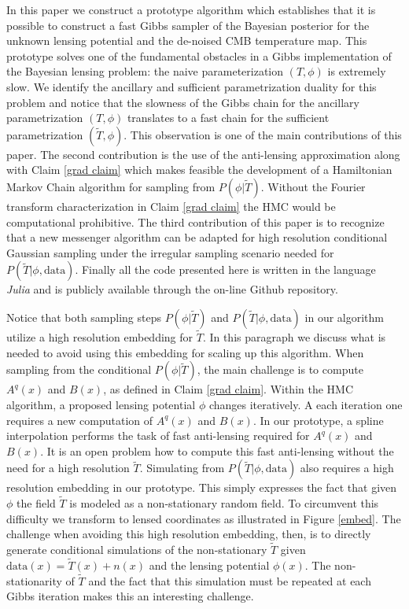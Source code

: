 \documentclass[iop,revtex4,apj,onecolumn]{emulateapj}
\begin{document}
In this paper we construct a prototype algorithm which establishes that it is possible to construct a fast Gibbs sampler of the Bayesian posterior for the unknown lensing potential and the de-noised CMB temperature map. This prototype solves one of the fundamental obstacles in a Gibbs implementation of the Bayesian lensing problem: the naive parameterization $(T, \phi)$ is extremely slow. We identify the ancillary and sufficient parametrization duality for this problem and notice that the slowness of the Gibbs chain for the ancillary parametrization  $(T, \phi)$ translates to a fast chain for the sufficient parametrization  $(\widetilde T, \phi)$. This observation is one of the main contributions of this paper. The second contribution is the use of the anti-lensing approximation along with Claim \ref{grad claim} which makes feasible the development of a Hamiltonian Markov Chain algorithm for sampling from  $P(\phi | \widetilde T)$. Without the Fourier transform characterization in Claim \ref{grad claim} the HMC would be computational prohibitive. The third contribution of this paper is to recognize that a new messenger algorithm \cite{elsner2013efficient,jasche2014matrix} can be adapted for high resolution conditional Gaussian sampling under the irregular sampling scenario needed for $P(\widetilde T|\phi, \text{data})$.  Finally all the code presented here is written in the language {\em Julia} \citep{bezanson2012julia}  and is publicly available through the on-line Github repository.  


Notice that both sampling steps $P(\phi |\widetilde T)$ and $P(\widetilde T|\phi, \text{data})$ in our algorithm utilize a high resolution embedding for $\widetilde T$. In this paragraph we discuss what is needed to avoid using this embedding for scaling up this algorithm. When sampling from the conditional $P(\phi |\widetilde T)$, the main challenge is to compute $A^q(x)$ and $B(x)$, as defined in Claim  \ref{grad claim}.  Within the HMC algorithm, a proposed lensing potential $\phi$ changes iteratively. A each iteration  one requires a new computation of $A^q(x)$ and $B(x)$. In our prototype, a spline interpolation performs the task of fast anti-lensing required for  $A^q(x)$ and $B(x)$. It is an open problem how to compute this fast anti-lensing without the need for a high resolution $\widetilde T$. Simulating from $P(\widetilde T|\phi, \text{data})$ also requires a high resolution embedding in our prototype. This simply expresses the fact that given $\phi$ the field $\widetilde T$ is modeled as a non-stationary random field. To circumvent this difficulty we  transform to lensed coordinates as illustrated in Figure \ref{embed}. The challenge when avoiding this high resolution embedding, then, is to directly generate conditional simulations of the non-stationary $\widetilde T$ given $\text{data}(x)=\widetilde T(x)+ n(x)$ and the lensing potential $\phi(x)$. The non-stationarity of $\widetilde T$ and the fact that this simulation must be repeated at each Gibbs iteration makes this an interesting challenge.
\end{document}
